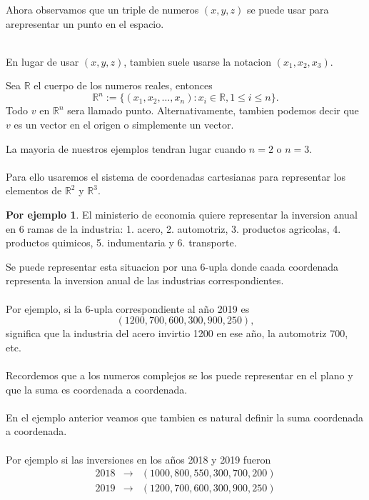 \documentclass{article}
\theoremstyle{definition}
\theoremstyle{definition}
\newtheorem*{ej}{Por ejemplo}
\theoremstyle{remark}
\begin{document}
Ahora observamos que un triple de numeros $(x,y,z)$ se puede usar para arepresentar un punto en el espacio.
\begin{figure}[h]
\centering
\def\svgwidth{0.5\textwidth}

\end{figure}\\
En lugar de usar $(x,y,z)$, tambien suele usarse la notacion $(x_1,x_2,x_3)$.
  \begin{defi}
    Sea $\mathbb{R}$ el cuerpo de los numeros reales, entonces \[
      \mathbb{R}^n:=\big\{(x_1,x_2,\dots, x_n):x_i \in \mathbb{R},1\leq i \leq n\big\}.
    \]
    Todo $v$ en $\mathbb{R}^n$ sera llamado punto. Alternativamente, tambien podemos decir que $v$ es un vector en el origen o simplemente un vector.
  \end{defi}
La mayoria de nuestros ejemplos tendran lugar cuando $n=2$ o $n=3$.\\\\
 Para ello usaremos el sistema de coordenadas cartesianas para representar los elementos de $\mathbb{R}^2$ y $\mathbb{R}^3$.
\begin{ej}
  El ministerio de economia quiere representar la inversion anual en $6$ ramas de la industria: 1. acero, 2. automotriz, 3. productos agricolas, 4. productos quimicos, 5. indumentaria y 6. transporte.
\end{ej}
Se puede representar esta situacion por una 6-upla donde caada coordenada representa la inversion anual de las industrias correspondientes. \\\\ 
Por ejemplo, si la 6-upla correspondiente al año 2019 es \[
  (1200,700,600,300,900,250),
\]
significa que la industria del acero invirtio 1200 en ese año, la automotriz 700, etc.
\\\\
Recordemos que a los numeros complejos se los puede representar en el plano y que la suma es coordenada a coordenada.
\\\\
En el ejemplo anterior veamos que tambien es natural definir la suma coordenada a coordenada.\\\\
Por ejemplo si las inversiones en los años 2018 y 2019 fueron
\[
  \begin{array}{llll}
    2018 & \to & (1000,800,550,300,700,200) \\
    2019 & \to & (1200,700,600,300,900,250)
  \end{array}
\]
\end{document}
